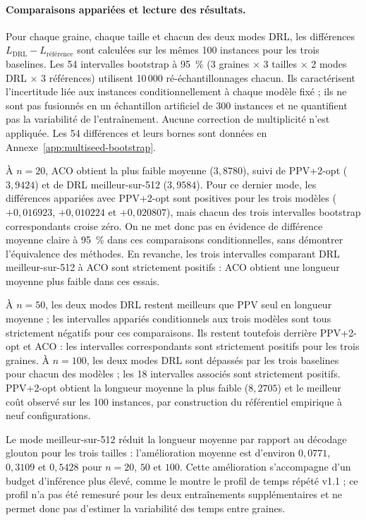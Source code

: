 \documentclass[12pt, a4paper, twoside, openright]{book}
\begin{document}
\paragraph{Comparaisons appariées et lecture des résultats.}
Pour chaque graine, chaque taille et chacun des deux modes DRL, les différences
$L_{\mathrm{DRL}}-L_{\text{référence}}$ sont calculées sur les mêmes 100
instances pour les trois baselines. Les 54 intervalles bootstrap à 95~\%
(3 graines $\times$ 3 tailles $\times$ 2 modes DRL $\times$ 3 références)
utilisent 10\,000 ré-échantillonnages chacun. Ils caractérisent l'incertitude
liée aux instances conditionnellement à chaque modèle fixé ; ils ne sont pas
fusionnés en un échantillon artificiel de 300 instances et ne quantifient pas
la variabilité de l'entraînement. Aucune correction de multiplicité n'est
appliquée. Les 54 différences et leurs bornes sont données en
Annexe~\ref{app:multiseed-bootstrap}.

À $n=20$, ACO obtient la plus faible moyenne ($3{,}8780$), suivi de PPV+2-opt
($3{,}9424$) et de DRL meilleur-sur-512 ($3{,}9584$). Pour ce dernier mode,
les différences appariées avec PPV+2-opt sont positives pour les trois
modèles ($+0{,}016923$, $+0{,}010224$ et $+0{,}020807$), mais chacun des trois
intervalles bootstrap correspondants croise zéro. On ne met donc pas en
évidence de différence moyenne claire à 95~\% dans ces comparaisons
conditionnelles, sans démontrer l'équivalence des méthodes. En revanche, les
trois intervalles comparant DRL meilleur-sur-512 à ACO sont strictement
positifs : ACO obtient une longueur moyenne plus faible dans ces essais.

À $n=50$, les deux modes DRL restent meilleurs que PPV seul en longueur
moyenne ; les intervalles appariés conditionnels aux trois modèles sont tous
strictement négatifs pour ces comparaisons. Ils restent toutefois derrière
PPV+2-opt et ACO : les intervalles correspondants sont strictement positifs
pour les trois graines. À $n=100$, les deux modes DRL sont dépassés par les
trois baselines pour chacun des modèles ; les 18 intervalles associés sont
strictement positifs. PPV+2-opt obtient la longueur moyenne la plus faible
($8{,}2705$) et le meilleur coût observé sur les 100 instances, par
construction du référentiel empirique à neuf configurations.

Le mode meilleur-sur-512 réduit la longueur moyenne par rapport au décodage
glouton pour les trois tailles : l'amélioration moyenne est d'environ
$0{,}0771$, $0{,}3109$ et $0{,}5428$ pour $n=20$, $50$ et $100$. Cette
amélioration s'accompagne d'un budget d'inférence plus élevé, comme le montre
le profil de temps répété v1.1 ; ce profil n'a pas été remesuré pour les deux
entraînements supplémentaires et ne permet donc pas d'estimer la variabilité
des temps entre graines.
\end{document}
